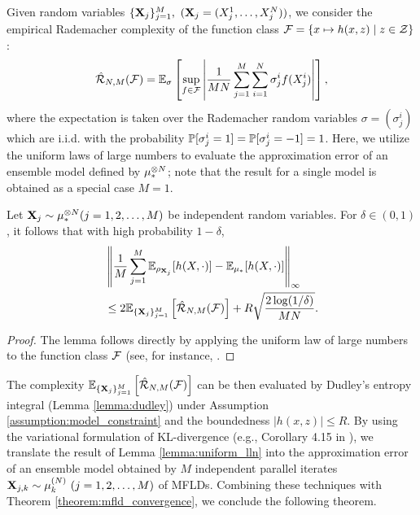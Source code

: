 Given random variables $\{\mathbf{X}_j\}_{j=1}^M,~(\mathbf{X}_j = (X^1_j,\ldots,X^N_j))$, we consider the empirical Rademacher complexity of the function class $\mathcal{F} = \{ x \mapsto h(x,z) \mid z \in \mathcal{Z} \}$:
\[ \hat{\mathcal{R}}_{N,M}(\mathcal{F}) 
    = \mathbb{E}_{\sigma}
    \left[ 
        \sup_{f \in \mathcal{F}} \left|\frac{1}{MN}\sum_{j=1}^M\sum_{i=1}^N \sigma^i_j f(X^i_j)  \right|
    \right], \] 
where the expectation is taken over the Rademacher random variables $\sigma=(\sigma^i_j)$ which are i.i.d. with the probability $\mathbb{P}[\sigma^i_j=1]=\mathbb{P}[\sigma^i_j=-1]=1$. Here, we utilize the uniform laws of large numbers to evaluate the approximation error of an ensemble model defined by $\tensor[\mu,N]_*$; note that the result for a single model is obtained as a special case $M=1$.
\begin{lemma}\label{lemma:uniform_lln}
    Let $\vX_j \sim \tensor[\mu,N]_* (j=1,2,\ldots,M)$ be independent random variables.
    For $\delta \in (0,1)$, it follows that with high probability $1-\delta$,
    \begin{align*}
        &\left\| \frac{1}{M}\sum_{j=1}^M\mathbb{E}_{\rho_{\mathbf{X}_j}}[h(X,\cdot)] - \mathbb{E}_{\mu_*}[h(X,\cdot)] \right\|_\infty \\
        &\leq 2\mathbb{E}_{\{\mathbf{X}_j\}_{j=1}^M}\left[\hat{\mathcal{R}}_{N,M}(\mathcal{F})\right] 
        + R \sqrt{ \frac{2\log(1/\delta)}{MN}}.
    \end{align*}
\end{lemma}
\begin{proof}
    The lemma follows directly by applying the uniform law of large numbers to the function class $\mathcal{F}$ (see, for instance, \citet{mohri2012foundations}.
\end{proof}
The complexity $\mathbb{E}_{\{\mathbf{X}_j\}_{j=1}^M}\left[\hat{\mathcal{R}}_{N,M}(\mathcal{F})\right]$ can be then evaluated by Dudley's entropy integral (Lemma \ref{lemma:dudley}) under Assumption \ref{assumption:model_constraint} and the boundedness $|h(x,z)| \leq R$. By using the variational formulation of KL-divergence (e.g., Corollary 4.15 in \citet{boucheron2013concentration}), we translate the result of Lemma \ref{lemma:uniform_lln} into the approximation error of an ensemble model obtained by $M$ independent parallel iterates $\vX_{j,k} \sim \pow[\mu,N]_k~(j=1,2,\ldots,M)$  of MFLDs. Combining these techniques with Theorem \ref{theorem:mfld_convergence}, we conclude the following theorem. 

